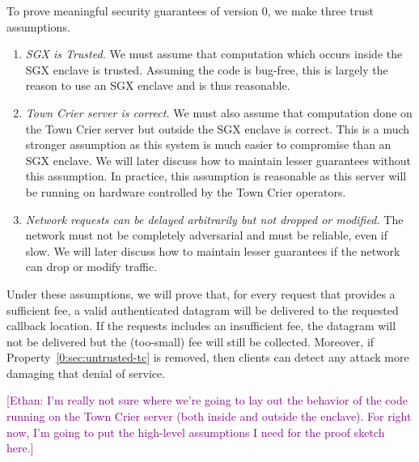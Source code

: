 \documentclass[letterpaper,twocolumn,10pt]{article}
\newcommand{\ethan}[1]{\textcolor{purple}{[\textsf{Ethan: #1}]}}
\begin{document}
To prove meaningful security guarantees of version 0, we make three trust assumptions.
\begin{enumerate}
  \item \label{0:sec:sgx}
    {\it SGX is Trusted.}
    We must assume that computation which occurs inside the SGX enclave is trusted.
    Assuming the code is bug-free, this is largely the reason to use an SGX enclave and is thus reasonable.

  \item \label{0:sec:untrusted-tc}
    {\it Town Crier server is correct.}
    We must also assume that computation done on the Town Crier server but outside the SGX enclave is correct.
    This is a much stronger assumption as this system is much easier to compromise than an SGX enclave.
    We will later discuss how to maintain lesser guarantees without this assumption.
    In practice, this assumption is reasonable as this server will be running on hardware controlled by the Town Crier operators.

  \item \label{0:sec:network}
    {\it Network requests can be delayed arbitrarily but not dropped or modified.}
    The network must not be completely adversarial and must be reliable, even if slow.
    We will later discuss how to maintain lesser guarantees if the network can drop or modify traffic.
\end{enumerate}
Under these assumptions, we will prove that, for every request that provides a sufficient fee,
a valid authenticated datagram will be delivered to the requested callback location.
If the requests includes an insufficient fee, the datagram will not be delivered but the (too-small) fee will still be collected.
Moreover, if Property~\ref{0:sec:untrusted-tc} is removed, then clients can detect any attack more damaging that denial of service.

\ethan{I'm really not sure where we're going to lay out the behavior of the code running on the Town Crier server (both inside and outside the enclave).
  For right now, I'm going to put the high-level assumptions I need for the proof sketch here.}
\end{document}
